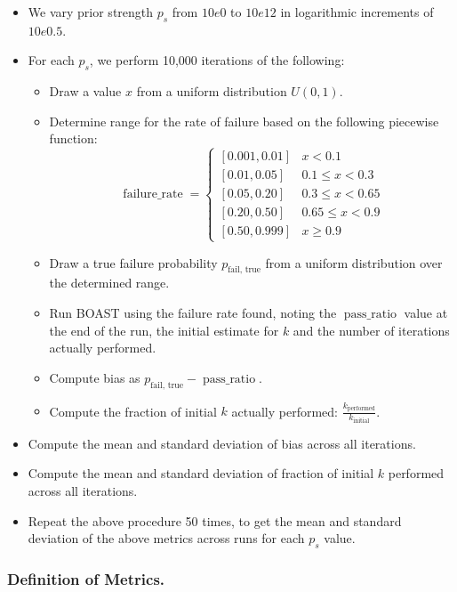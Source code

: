     \begin{itemize}
        \item We vary prior strength $p_s$ from $10e0$ to $10e12$ in logarithmic increments of $10e0.5$.
        \item For each $p_s$, we perform 10,000 iterations of the following:
        \begin{itemize}
            \item Draw a value $x$ from a uniform distribution $U(0, 1)$.
            \item Determine range for the rate of failure based on the following piecewise function:
            \[
                \operatorname{failure\_rate} = \begin{cases}
                [0.001, 0.01] & x < 0.1 \\
                [0.01, 0.05] & 0.1 \le x < 0.3 \\
                [0.05, 0.20] & 0.3 \le x < 0.65 \\
                [0.20, 0.50] & 0.65 \le x < 0.9 \\
                [0.50, 0.999] & x \ge 0.9
                \end{cases}
            \]
            \item Draw a true failure probability $p_\text{fail, true}$ from a uniform distribution over the determined range.
            \item Run BOAST using the failure rate found, noting the $\operatorname{pass\_ratio}$ value at the end of the run, the initial estimate for $k$ and the number of iterations actually performed.
            \item Compute bias as $p_\text{fail, true} - \operatorname{pass\_ratio}$.
            \item Compute the fraction of initial $k$ actually performed: $\frac{k_\text{performed}}{k_\text{initial}}$.
        \end{itemize}
        \item Compute the mean and standard deviation of bias across all iterations.
        \item Compute the mean and standard deviation of fraction of initial $k$ performed across all iterations.
        \item Repeat the above procedure 50 times, to get the mean and standard deviation of the above metrics across runs for each $p_s$ value.
    \end{itemize}

    \subsubsection{Definition of Metrics.}

